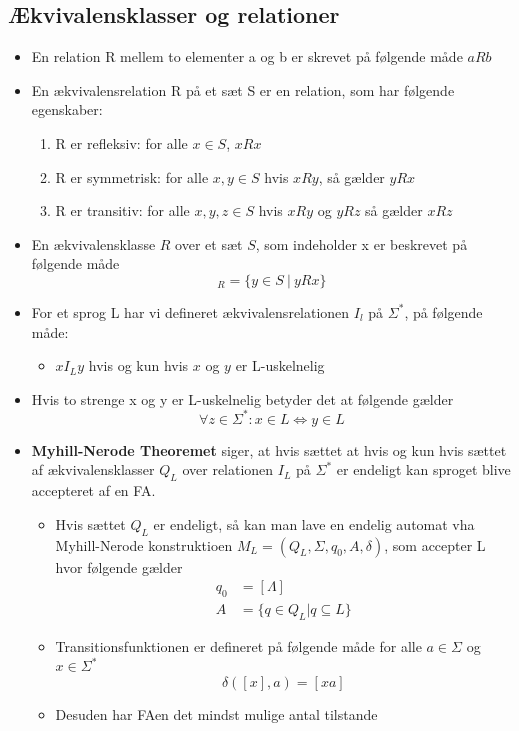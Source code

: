 \documentclass[a4, danish]{article}
\begin{document}
\subsection{Ækvivalensklasser og relationer}
\begin{itemize}
  \item En relation R mellem to elementer a og b er skrevet på følgende måde $aRb$
  \item En ækvivalensrelation R på et sæt S er en relation, som har følgende egenskaber:
  \begin{enumerate}
    \item R er refleksiv: for alle $x \in S$, $xRx$
    \item R er symmetrisk: for alle $x,y \in S$ hvis $xRy$, så gælder $yRx$
    \item R er transitiv: for alle $x,y,z \in S$ hvis $xRy$ og $yRz$ så gælder $xRz$
  \end{enumerate}
  \item En ækvivalensklasse $R$ over et sæt $S$, som indeholder x er beskrevet på følgende måde
  \begin{equation*}
    [x]_R=\{ y \in S \ | \ yRx  \}
  \end{equation*}
  \item For et sprog L har vi defineret ækvivalensrelationen $I_l$ på $\Sigma^*$, på følgende måde:
  \begin{itemize}
    \item $xI_Ly$ hvis og kun hvis $x$ og $y$ er L-uskelnelig
  \end{itemize}
  \item Hvis to strenge x og y er L-uskelnelig betyder det at følgende gælder
  \begin{equation*}
    \forall z \in \Sigma^*: x \in L \Leftrightarrow  y \in L
  \end{equation*}
  \item \textbf{Myhill-Nerode Theoremet} siger, at hvis sættet at hvis og kun hvis sættet af ækvivalensklasser $Q_L$ over relationen $I_L$ på $\Sigma^*$ er endeligt kan sproget blive accepteret af en FA. 
  \begin{itemize}
    \item Hvis sættet $Q_L$ er endeligt, så kan man lave en endelig automat vha Myhill-Nerode konstruktioen $M_L=(Q_L,\Sigma,q_0,A,\delta)$, som accepter L hvor følgende gælder 
    \begin{align*}
      q_0 &= [\Lambda] \\
      A &= \{ q \in Q_L | q \subseteq L \}
    \end{align*}
    \item Transitionsfunktionen er defineret på følgende måde for alle $a \in \Sigma$ og $x \in \Sigma^*$
    \begin{equation*}
      \delta([x], a) = [xa]
    \end{equation*}
    \item Desuden har FAen det mindst mulige antal tilstande 
  \end{itemize}
\end{itemize}
\end{document}
